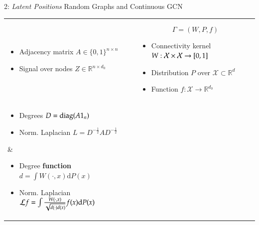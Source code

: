\documentclass[final,dvipsnames]{beamer}
\newcommand{\vsp}{\vspace{10pt}}
\begin{document}
\begin{frame}{}
\begin{columns}[t]
\begin{column}{0.45\linewidth}
\begin{block}{2: \emph{Latent Positions} Random Graphs and Continuous GCN}
\begin{table}
\begin{tabular}{p{\lsi\textwidth}|p{\rsi\textwidth}}
\parbox{\lsi\textwidth}{\normalsize
\vsp
\begin{itemize}
\item Adjacency matrix $A \in \{0,1\}^{n\times n}$
\item Signal over nodes $Z \in \mathbb{R}^{n\times d_0}$
\end{itemize}
}
&
\vspace{-2.5cm}
\begin{equation*}
\Gamma=(W,P,f)
\end{equation*}

\parbox{\rsi\textwidth}{\normalsize
\vsp
\begin{itemize}
\item Connectivity kernel $W: \mathcal{X} \times \mathcal{X} \to [0,1]$
\item Distribution $P$ over $\mathcal{X} \subset \mathbb{R}^d$
\item Function $f:\mathcal{X} \to \mathbb{R}^{d_0}$
\end{itemize}
\vspace{1cm}
}
\\
\hdashline
\parbox{\lsi\textwidth}{\normalsize
\vsp
\begin{itemize}
\item Degrees $D = \operatorname{diag}(A 1_n)$
\item Norm. Laplacian $L=D^{-\frac12} A D^{-\frac12}$
\end{itemize}
}
&
\parbox{\rsi\textwidth}{\normalsize
\vsp
\begin{itemize}
\item Degree \textbf{function} $d = \int W(\cdot,x)\mathrm{d}P(x)$
\item Norm. Laplacian
$
\mathcal{L} f = \int \frac{W(\cdot, x)}{\sqrt{d(\cdot)d(x)}} f(x)\mathrm{d}P(x)
$
\end{itemize}
}\\
\hdashline
\end{tabular}


\end{table}
\end{block}
\end{column}
\end{columns}
\end{frame}
\end{document}
